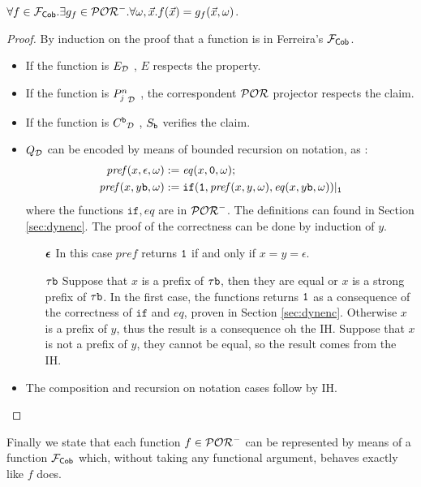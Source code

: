 \begin{remark}
  \label{rem:cobtopor}
  $\forall f \in \mathcal{F}_{\mathsf{Cob}}.\exists g_f \in\mathcal{POR}^-.
  \forall \omega, \vec x. f(\vec x)=g_f(\vec x,\omega)$.
\end{remark}
\begin{proof}
  By induction on the proof that a function is in Ferreira's $\mathcal{F}_{\mathsf{Cob}}$.

  \begin{itemize}
    \item If the function is ${E}_{\mathcal{D}}$ , $E$ respects the property.
    \item If the function is ${P^n_j}_{\mathcal{D}}$ , the correspondent $\mathcal{POR}$
    projector respects the claim.
    \item If the function is ${C^{\mathtt{b}}}_{\mathcal{D}}$ , $S_{\mathtt{b}}$ verifies the claim.
    \item ${Q}_{\mathcal{D}}$ can be encoded by means of bounded recursion on notation, as :
    \begin{align*}
      \mathit{pref}(x, \epsilon, \omega) &:= \mathit{eq}(x, \mathtt{0}, \omega); \\
      \mathit{pref}(x, y\mathtt{b}, \omega) &:= \mathtt{if}(\mathtt{1}, \mathit{pref}(x, y, \omega), \mathit{eq}(x, y\mathtt{b}, \omega))|_{\mathtt{1}}
    \end{align*}
    where the functions $\mathtt{if}, \mathit{eq}$ are in $\mathcal{POR}^-$. The definitions
    can found in Section \ref{sec:dynenc}.
    The proof of the correctness can be done by induction of $y$.
    \begin{itemize}
      \item[$\bm{\epsilon}$] In this case $\mathit{pref}$ returns $\mathtt{1}$ if and only if $x=y=\epsilon$.
      \item[$\tau\mathtt{b}$] Suppose that $x$ is a prefix of $\tau \mathtt{b}$, then they are equal or
      $x$ is a strong prefix of $\tau\mathtt{b}$. In the first case, the functions returns $\mathtt{1}$
      as a consequence of the correctness of $\mathtt{if}$ and $\mathit{eq}$, proven
      in Section \ref{sec:dynenc}. Otherwise $x$ is a prefix of $y$, thus the result is a consequence oh the IH.
      Suppose that $x$ is not a prefix of $y$, they cannot be equal, so the result comes from the IH.
    \end{itemize}
    \item The composition and recursion on notation cases
    follow by IH.
  \end{itemize}
\end{proof}

Finally we state that each function $f \in \mathcal{POR}^-$ can be represented
by means of a function $\mathcal{F}_{\mathsf{Cob}}$ which, without taking any functional argument,
behaves exactly like $f$ does.

